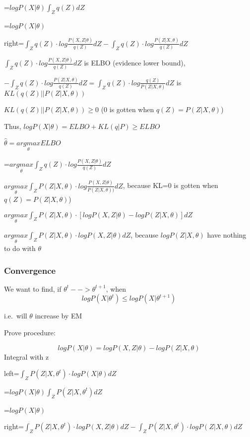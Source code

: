 \documentclass[
]{article}
\begin{document}
\qquad =\(logP(X|\theta)\int_Z q(Z)dZ\)

\qquad =\(logP(X|\theta)\)

right=\(\int_Z q(Z)\cdot log\frac {P(X,Z|\theta)} {q(Z)}dZ-\int_Z q(Z)\cdot log\frac{P(Z|X,\theta)} {q(Z)}dZ\)

\(\int_Z q(Z)\cdot log\frac {P(X,Z|\theta)} {q(Z)}dZ\) is ELBO (evidence
lower bound),

\(-\int_Z q(Z)\cdot log\frac{P(Z|X,\theta)} {q(Z)}dZ=\int_Z q(Z)\cdot log\frac {q(Z)}{P(Z|X,\theta)}dZ\)
is \(KL(q(Z)||P(Z|X,\theta))\)

\(KL(q(Z)||P(Z|X,\theta)) \geq 0\) (0 is gotten when
\(q(Z)=P(Z|X,\theta)\))

Thus, \(logP(X|\theta)=ELBO+KL(q|P)\geq ELBO\)

\(\hat \theta=\underset \theta {argmax} ELBO\)

\qquad =\(\underset \theta {argmax}\int_Z q(Z)\cdot log\frac {P(X,Z|\theta)} {q(Z)}dZ\)

\qquad \(\underset \theta {argmax}\int_Z P(Z|X,\theta)\cdot log\frac {P(X,Z|\theta)} {P(Z|X,\theta))}dZ\),
because KL=0 is gotten when \(q(Z)=P(Z|X,\theta)\))

\qquad \(\underset \theta {argmax}\int_Z P(Z|X,\theta)\cdot [logP(X,Z|\theta)-logP(Z|X,\theta)]dZ\)

\qquad \(\underset \theta {argmax}\int_Z P(Z|X,\theta)\cdot logP(X,Z|\theta)dZ\),
because \(logP(Z|X,\theta)\) have nothing to do with \(\theta\)

\hypertarget{convergence}{%
\subsubsection{Convergence}\label{convergence}}

We want to find, if \(\theta^t-->\theta^{t+1}\), when
\[logP(X|\theta^t)\leq logP(X|\theta^{t+1})\]

i.e.~will \(\theta\) increase by EM

Prove procedure:

\[logP(X|\theta)=logP(X,Z|\theta)-logP(Z|X,\theta)\] Integral with z

left=\(\int_Z P(Z|X,\theta^t)\cdot logP(X|\theta)dZ\)

\qquad =\(logP(X|\theta)\int_Z P(Z|X,\theta^t)dZ\)

\qquad =\(logP(X|\theta)\)

right=\(\int_Z P(Z|X,\theta^t)\cdot logP(X,Z|\theta)dZ-\int_Z P(Z|X,\theta^t)\cdot logP(Z|X,\theta)dZ\)
\end{document}
